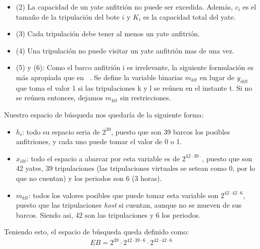\documentclass[letter, 10pt]{article}
\begin{document}
\begin{itemize}
\begin{itemize}
        \item (2) La capacidad de un yate anfitrión no puede ser excedida. Además, $c_i$ es el tamaño de la tripulación del bote $i$ y $K_i$ es la capacidad total del yate.
        \item (3) Cada tripulación debe tener al menos un yate anfitrión.
        \item (4) Una tripulación no puede visitar un yate anfitrión mas de una vez. 
        \item (5) y (6): Como el barco anfitrión i es irrelevante, la siguiente formulación es más apropiada que en ~\cite{Walser:1997:SLP:1867406.1867448}. Se define la variable binarias $m_{klt}$ en lugar de $y_{iklt}$ que toma el valor 1 si las tripulaciones k y l se reúnen en el instante t. Si no se reúnen entonces, dejamos $m_{klt}$ sin restricciones.
    \end{itemize}
\end{itemize}
Nuestro espacio de búsqueda nos quedaría de la siguiente forma:
\begin{itemize}
    \item $h_i$: todo su espacio seria de $2^{39}$, puesto que son 39 barcos los posibles  anfitriones, y cada uno puede tomar el valor de 0 o 1.
    \item $x_{ikt}$: todo el espacio a abarcar por esta variable es de $2^{42\cdot39\cdot}$, puesto que son 42 yates, 39 tripulaciones (las tripulaciones virtuales se setean como 0, por lo que no cuentan) y los periodos son 6 (3 horas).
    \item $m_{klt}$: todos los valores posibles que puede tomar esta variable son $2^{42\cdot42\cdot6}$, puesto que las tripulaciones \textit{host} si cuentan, aunque no se mueven de sus barcos. Siendo asi, 42 son las tripulaciones y 6 los periodos.
\end{itemize}
Teniendo esto, el espacio de búsqueda queda definido como:
\begin{align*}
    EB = 2^{39} \cdot 2^{42\cdot39\cdot6} \cdot 2^{42\cdot42\cdot6}
\end{align*}
\end{document}
